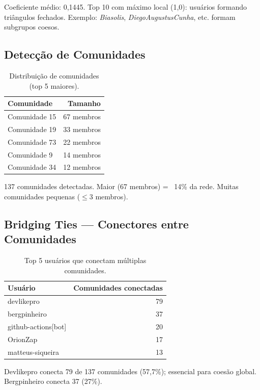 \documentclass[12pt]{article}
\begin{document}
Coeficiente médio: 0,1445. Top 10 com máximo local (1,0): usuários formando triângulos fechados. Exemplo: \textit{Biasolis}, \textit{DiegoAugustusCunha}, etc. formam subgrupos coesos.

\subsection{Detecção de Comunidades}

\begin{table}[H]
  \centering
  \caption{Distribuição de comunidades (top 5 maiores).}
  \label{tab:comunidades}
  \begin{tabular}{l|r}
    \toprule
    \textbf{Comunidade} & \textbf{Tamanho} \\
    \midrule
    Comunidade 15 & 67 membros \\
    Comunidade 19 & 33 membros \\
    Comunidade 73 & 22 membros \\
    Comunidade 9  & 14 membros \\
    Comunidade 34 & 12 membros \\
    \bottomrule
  \end{tabular}
\end{table}

137 comunidades detectadas. Maior (67 membros) = ~14\% da rede. Muitas comunidades pequenas ($\leq 3$ membros).

\subsection{Bridging Ties --- Conectores entre Comunidades}

\begin{table}[H]
  \centering
  \caption{Top 5 usuários que conectam múltiplas comunidades.}
  \label{tab:bridging}
  \begin{tabular}{l|r}
    \toprule
    \textbf{Usuário} & \textbf{Comunidades conectadas} \\
    \midrule
    devlikepro       & 79 \\
    bergpinheiro     & 37 \\
    github-actions[bot] & 20 \\
    OrionZap         & 17 \\
    matteus-siqueira & 13 \\
    \bottomrule
  \end{tabular}
\end{table}

Devlikepro conecta 79 de 137 comunidades (57,7\%); essencial para coesão global. Bergpinheiro conecta 37 (27\%).
\end{document}
